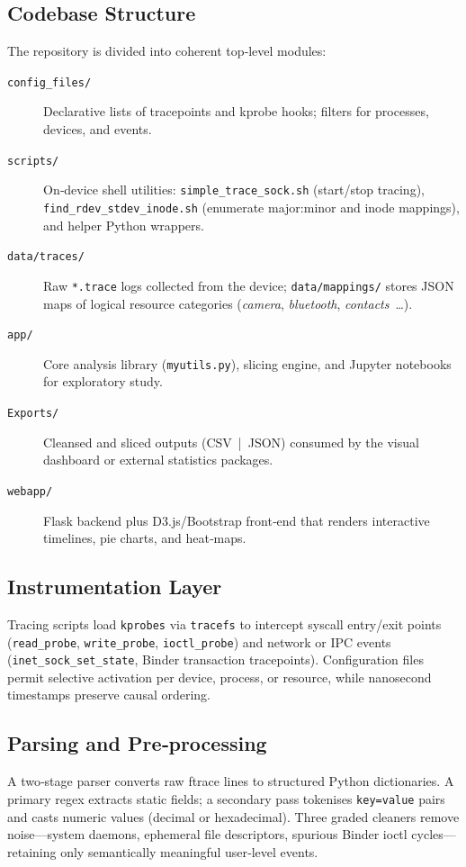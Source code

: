 \documentclass[a4paper,12pt]{report}
\begin{document}
\subsection{Codebase Structure}

The repository is divided into coherent top‑level modules:
\begin{description}
\item[\texttt{config\_files/}] Declarative lists of tracepoints and kprobe hooks; filters for processes, devices, and events.
\item[\texttt{scripts/}] On‑device shell utilities: \texttt{simple\_trace\_sock.sh} (start/stop tracing), \texttt{find\_rdev\_stdev\_inode.sh} (enumerate major:minor and inode mappings), and helper Python wrappers.
\item[\texttt{data/traces/}] Raw \texttt{*.trace} logs collected from the device; \texttt{data/mappings/} stores JSON maps of logical resource categories (\emph{camera}, \emph{bluetooth}, \emph{contacts} \ldots).
\item[\texttt{app/}] Core analysis library (\texttt{myutils.py}), slicing engine, and Jupyter notebooks for exploratory study.
\item[\texttt{Exports/}] Cleansed and sliced outputs (CSV | JSON) consumed by the visual dashboard or external statistics packages.
\item[\texttt{webapp/}] Flask backend plus D3.js/Bootstrap front‑end that renders interactive timelines, pie charts, and heat‑maps.
\end{description}

\subsection{Instrumentation Layer}
Tracing scripts load \texttt{kprobes} via \texttt{tracefs} to intercept syscall entry/exit points (\texttt{read\_probe}, \texttt{write\_probe}, \texttt{ioctl\_probe}) and network or IPC events (\texttt{inet\_sock\_set\_state}, Binder transaction tracepoints). Configuration files permit selective activation per device, process, or resource, while nanosecond timestamps preserve causal ordering.

\subsection{Parsing and Pre‑processing}
A two‑stage parser converts raw ftrace lines to structured Python dictionaries. A primary regex extracts static fields; a secondary pass tokenises \texttt{key=value} pairs and casts numeric values (decimal or hexadecimal). Three graded cleaners remove noise—system daemons, ephemeral file descriptors, spurious Binder ioctl cycles—retaining only semantically meaningful user‑level events.
\end{document}
